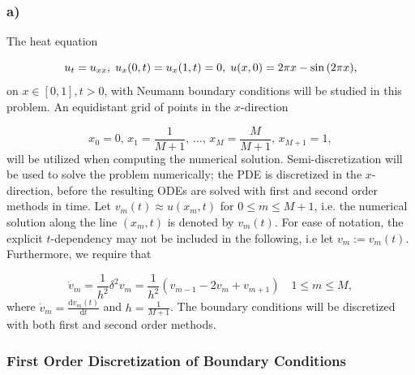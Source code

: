 \subsubsection{a)}
The heat equation 

\begin{equation}
    u_t = u_{xx}, \hspace{1mm} u_x(0,t) = u_x(1,t) = 0, \hspace{1mm} u(x,0) = 2\pi x - \sin{(2\pi x)},
\label{heat_eq}
\end{equation}
on $x \in [0,1], t > 0$, with Neumann boundary conditions will be studied in this problem. An equidistant grid of points in the $x$-direction

\begin{equation*}
    x_0 = 0, \, x_1 = \frac{1}{M+1}, \, \dots, \, x_M = \frac{M}{M+1}, \, x_{M+1} = 1,
\end{equation*}
will be utilized when computing the numerical solution. Semi-discretization will be used to solve the problem numerically; the PDE is discretized in the $x$-direction, before the resulting ODEs are solved with first and second order methods in time. Let $v_m(t) \approx u(x_m,t)$ for $0 \le m \le M + 1$, i.e. the numerical solution along the line $(x_m, t)$ is denoted by $v_m(t)$. For ease of notation, the explicit $t$-dependency may not be included in the following, i.e let $v_m := v_m(t)$. Furthermore, we require that 

\begin{equation}
    \dot{v}_m = \frac{1}{h^2} \delta^2 v_m = \frac{1}{h^2}(v_{m-1} - 2v_m + v_{m+1}) \quad 1 \le m \le M,
\label{cd}
\end{equation}
where $\dot{v}_m = \frac{\mathrm{d}v_m(t)}{\mathrm{d}t}$ and $h = \frac{1}{M+1}$. The boundary conditions will be discretized with both first and second order methods.
\subsubsection{First Order Discretization of Boundary Conditions}





